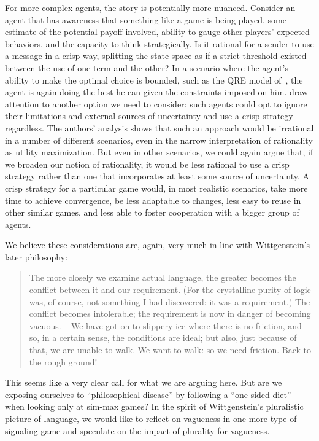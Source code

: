 \documentclass[a4paper]{article}
\begin{document}
For more complex agents, the story is potentially more nuanced.
Consider an agent that has awareness that something like a game is being played, some estimate of the potential payoff involved, ability to gauge other players' expected behaviors, and the capacity to think strategically.
Is it rational for a sender to use a message in a crisp way, splitting the state space as if a strict threshold existed between the use of one term and the other?
In a scenario where the agent's ability to make the optimal choice is bounded, such as the QRE model of~\textcite{franke_vagueness_2011}, the agent is again doing the best he can given the constraints imposed on him.
\textcite{lawry_vagueness_2017} draw attention to another option we need to consider: such agents could opt to ignore their limitations and external sources of uncertainty and use a crisp strategy regardless.
The authors' analysis shows that such an approach would be irrational in a number of different scenarios, even in the narrow interpretation of rationality as utility maximization.
But even in other scenarios, we could again argue that, if we broaden our notion of rationality, it would be less rational to use a crisp strategy rather than one that incorporates at least some source of uncertainty.
A crisp strategy for a particular game would, in most realistic scenarios, take more time to achieve convergence, be less adaptable to changes, less easy to reuse in other similar games, and less able to foster cooperation with a bigger group of agents.

We believe these considerations are, again, very much in line with Wittgenstein's later philosophy:
\begin{quote}
The more closely we examine actual language, the greater becomes the conflict between it and our requirement.
(For the crystalline purity of logic was, of course, not something I had discovered: it was a requirement.)
The conflict becomes intolerable; the requirement is now in danger of becoming vacuous.
– We have got on to slippery ice where there is no friction, and so, in a certain sense, the conditions are ideal; but also, just because of that, we are unable to walk.
We want to walk: so we need friction.
Back to the rough ground!%
~\parencite*[\S 107]{wittgenstein_philosophical_1953}
\end{quote}
This seems like a very clear call for what we are arguing here.
But are we exposing ourselves to ``philosophical disease'' by following a ``one-sided diet''~\parencite*[\S 593]{wittgenstein_philosophical_1953} when looking only at sim-max games?
In the spirit of Wittgenstein's pluralistic picture of language, we would like to reflect on vagueness in one more type of signaling game and speculate on the impact of plurality for vagueness.
\end{document}
